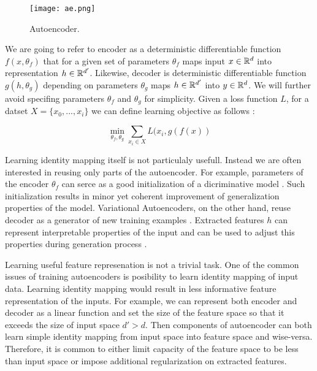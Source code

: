 \begin{figure}[h!]
  \centering
    \texttt{[image: ae.png]}
  \caption{Autoencoder.}
  \label{fig:ae}
\end{figure}



We are going to refer to encoder as a deterministic differentiable function $f(x, \theta_f)$ that for a given set of parameters $\theta_f$ maps input $x\in \Bbb{R}^d$ into representation $h \in \Bbb{R}^{d'}$.
Likewise, decoder is deterministic differentiable function $g(h, \theta_g)$ depending on parameters $\theta_g$ maps $h\in\Bbb{R}^{d'}$ into $y\in \Bbb{R}^d$. We will further avoid specifing parameters $\theta_f$ and $\theta_g$ for simplicity.
Given a loss function $L$, for a datset $X=\{x_0, ..., x_i\}$ we can define learning objective as follows \cite{Good2016}:

\begin{equation}\label{eq:primal}
\min_{\theta_f, \theta_g}\sum\limits_{x_i \in X}{L(x_i, g(f(x))}
\end{equation}

Learning identity mapping itself is not particulaly usefull.
Instead we are often interested in reusing only parts of the autoencoder.
For example, parameters of the encoder $\theta_f$ can serce as a good initialization of a dicriminative model \cite{Masci2011, Vincent2010, Zhao2015}.
Such initialization results in minor yet coherent improvement of generalization properties of the model.
Variational Autoencoders, on the other hand, reuse decoder as a generator of new training examples \cite{Kingma2013}.
Extracted features $h$ can represent interpretable properties of the input and can be used to adjust this
properties during generation process \cite{Kulkarni2015, Whitney2016}.

Learning useful feature represenation is not a trivial task.
One of the common issues of training autoencoders is posibility to learn identity mapping of input data.
Learning identity mapping would result in less informative feature representation of the inputs.
For example, we can represent both encoder and decoder as a linear function and set the size of the feature space so that it exceeds the size of input space $d' > d$.
Then components of autoencoder can both learn simple identity mapping from input space into feature space and wise-versa.
Therefore, it is common to either limit capacity of the feature space to be less than input space or impose additional regularization on extracted features.

